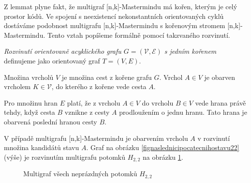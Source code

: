Z lemmat plyne fakt, že multigraf [n,k]-Mastermindu má kořen, kterým je celý prostor kódů. Ve spojení s neexistencí nekonstantních orientovaných cyklů dostáváme podobnost multigrafu [n,k]-Mastermindu s kořenovým stromem [n,k]-Mastermindu. Tento vztah popíšeme formálně pomocí takzvaného rozvinutí.
\begin{definice}
    \emph{Rozvinutí orientovaně acyklického grafu $G = (\mathcal{V}, \mathcal{E})$ s jedním kořenem} definujeme jako orientovaný graf $T = (V, E)$.
    
    Množina vrcholů $V$ je množina cest z kořene grafu $G$. Vrchol $A \in V$ je obarven vrcholem $K \in \mathcal{V}$, do kterého z kořene vede cesta $A$. 
    
    Pro množinu hran $E$ platí, že z vrcholu $A \in V$ do vrcholu $B \in V$ vede hrana právě tehdy, když cesta $B$ vznikne z cesty $A$ prodloužením o jednu hranu. Tato hrana je obarvená poslední hranou cesty $B$. 
\end{definice}
V případě multigrafu [n,k]-Mastermindu je obarvením vrcholu $A$ v rozvinutí množina kandidátů stavu $A$. Graf na obrázku \ref{fignaslednicipocatecnihostavu22} (výše) je rozvinutím multigrafu potomků $H_{2,2}$ na obrázku \ref{figpotomciH22}.

\begin{figure}[h!]
    \centering
    \caption{Multigraf všech neprázdných potomků $H_{2,2}$}
    \label{figpotomciH22}
\end{figure}


